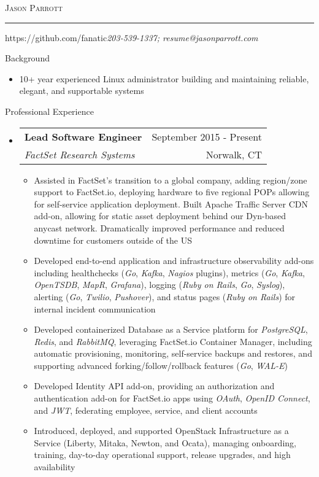 \documentclass[letterpaper,10pt]{article}
\makeatletter
\newcommand{\name}{Jason Parrott}
\newcommand{\addr}{https://github.com/fanatic}
\newcommand{\phone}{203-539-1337}
\newcommand{\email}{resume@jasonparrott.com}
\newcommand{\bigname}[1]{
	\begin{center}\fontfamily{phv}\selectfont\Huge\scshape#1\end{center}
}
\newenvironment{ressection}[1]{
	\vspace{4pt}
	{\fontfamily{phv}\selectfont\Large#1}
	\begin{itemize}
	\vspace{3pt}
}{
	\end{itemize}
}
\newcommand{\ressubitem}[1]{
	\vspace{-1pt}
	\item \begin{flushleft} #1 \end{flushleft}
}
\newcommand{\resbigitem}[4]{
	\vspace{-5pt}
	\item
	\begin{tabular*}{6in}{l@{\extracolsep{\fill}}r}
		\textbf{#1} & #2 \\
		\textit{#3} & #4\\
	\end{tabular*}
}
\newenvironment{ressubsec}[4]{
	\resbigitem{#1}{#2}{#3}{#4}
	\vspace{-2pt}
	\begin{itemize}
}{
	\end{itemize}
}
\makeatother
\begin{document}
\bigname{\name}

\vspace{-8pt} \rule{\textwidth}{1pt}

\vspace{-1pt} {\small \addr \hfill \itshape\phone; \email}

\vspace{8 pt}

\begin{ressection}{Background}
	\item[]
	10+ year experienced Linux administrator building and maintaining reliable, elegant, and supportable systems
\end{ressection}

\begin{ressection}{Professional Experience}
	\begin{ressubsec}{Lead Software Engineer}{September 2015 - Present}{FactSet Research Systems}{Norwalk, CT}
		\ressubitem{Assisted in FactSet's transition to a global company, adding region/zone support to FactSet.io, deploying hardware to five regional POPs allowing for self-service application deployment.  Built Apache Traffic Server CDN add-on, allowing for static asset deployment behind our Dyn-based anycast network.  Dramatically improved performance and reduced downtime for customers outside of the US}
		\ressubitem{Developed end-to-end application and infrastructure observability add-ons including healthchecks (\textit{Go}, \textit{Kafka}, \textit{Nagios} plugins), metrics (\textit{Go}, \textit{Kafka}, \textit{OpenTSDB}, \textit{MapR}, \textit{Grafana}), logging (\textit{Ruby on Rails}, \textit{Go}, \textit{Syslog}), alerting (\textit{Go}, \textit{Twilio}, \textit{Pushover}), and status pages (\textit{Ruby on Rails}) for internal incident communication}
		\ressubitem{Developed containerized Database as a Service platform for \textit{PostgreSQL}, \textit{Redis}, and \textit{RabbitMQ}, leveraging FactSet.io Container Manager, including automatic provisioning, monitoring, self-service backups and restores, and supporting advanced forking/follow/rollback features (\textit{Go}, \textit{WAL-E})}
		\ressubitem{Developed Identity API add-on, providing an authorization and authentication add-on for FactSet.io apps using \textit{OAuth}, \textit{OpenID Connect}, and \textit{JWT}, federating employee, service, and client accounts}
		\ressubitem{Introduced, deployed, and supported OpenStack Infrastructure as a Service (Liberty, Mitaka, Newton, and Ocata), managing onboarding, training, day-to-day operational support, release upgrades, and high availability}

\end{ressubsec}
\end{ressection}
\end{document}
